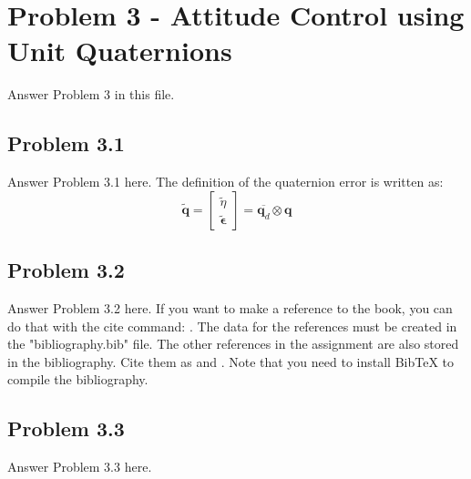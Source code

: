 \section*{Problem 3 - Attitude Control using Unit Quaternions}
Answer Problem 3 in this file.

\subsection*{Problem 3.1}
Answer Problem 3.1 here. The definition of the quaternion error is written as:
\begin{equation}
\tilde{\mathbf{q}} = \begin{bmatrix} \tilde{\eta} \\ \tilde{\boldsymbol{\epsilon}} \end{bmatrix} =\overline{\mathbf{q}_d} \otimes \mathbf{q}
\end{equation}

\subsection*{Problem 3.2}
Answer Problem 3.2 here. If you want to make a reference to the book, you can do that with the cite command: \cite{Fossen2011}. The data for the references must be created in the "bibliography.bib" file. The other references in the assignment are also stored in the bibliography. Cite them as \cite{Chateurverdi} and \cite{Fjellstad1994857}. Note that you need to install BibTeX to compile the bibliography.

\subsection*{Problem 3.3}
Answer Problem 3.3 here.
